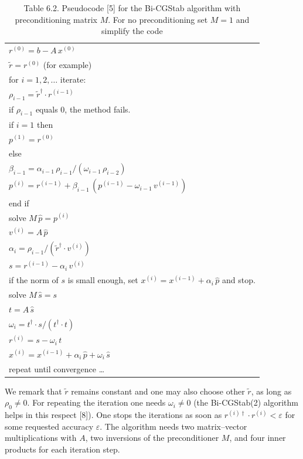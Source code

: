 \begin{table}[htbp]
  \centering
  \caption*{Table 6.2. Pseudocode [5] for the Bi-CGStab algorithm with
    preconditioning matrix $M$. For no preconditioning set $M = 1$ and simplify
    the code}
  \small
  \begin{tabular}{@{}l@{}}
    $r^{(0)} = b - A\, x^{(0)}$ \\
    $\tilde{r} = r^{(0)}$ \quad (for example) \\
    for $i = 1, 2, \ldots$ iterate: \\
    \quad $\rho_{i-1} = \tilde{r}^{\dagger} \cdot r^{(i-1)}$ \\
    \quad if $\rho_{i-1}$ equals 0, the method fails. \\
    \quad if $i = 1$ then \\
    \quad\quad $p^{(1)} = r^{(0)}$ \\
    \quad else \\
    \quad\quad $\beta_{i-1} = \alpha_{i-1}\, \rho_{i-1} / (\omega_{i-1}\,
      \rho_{i-2})$ \\
    \quad\quad $p^{(i)} = r^{(i-1)} + \beta_{i-1}\, (p^{(i-1)} - \omega_{i-1}\,
      v^{(i-1)})$ \\
    \quad end if \\
    \quad solve $M\, \hat{p} = p^{(i)}$ \\
    \quad $v^{(i)} = A\, \hat{p}$ \\
    \quad $\alpha_i = \rho_{i-1} / (\tilde{r}^{\dagger} \cdot v^{(i)})$ \\
    \quad $s = r^{(i-1)} - \alpha_i\, v^{(i)}$ \\
    \quad if the norm of $s$ is small enough, set $x^{(i)} = x^{(i-1)} +
      \alpha_i\, \hat{p}$ and stop. \\
    \quad solve $M\, \hat{s} = s$ \\
    \quad $t = A\, \hat{s}$ \\
    \quad $\omega_i = t^{\dagger} \cdot s / (t^{\dagger} \cdot t)$ \\
    \quad $r^{(i)} = s - \omega_i\, t$ \\
    \quad $x^{(i)} = x^{(i-1)} + \alpha_i\, \hat{p} + \omega_i\, \hat{s}$ \\
    repeat until convergence \ldots
  \end{tabular}
\end{table}

We remark that $\tilde{r}$ remains constant and one may also choose other
$\tilde{r}$, as long as $\rho_0 \neq 0$. For repeating the iteration one needs
$\omega_i \neq 0$ (the Bi-CGStab(2) algorithm helps in this respect [8]). One
stops the iterations as soon as $r^{(i)\dagger} \cdot r^{(i)} < \varepsilon$ for
some requested accuracy $\varepsilon$. The algorithm needs two matrix--vector
multiplications with $A$, two inversions of the preconditioner $M$, and four
inner products for each iteration step.

